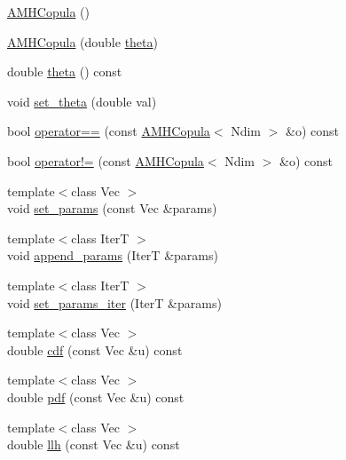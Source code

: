 \begin{DoxyCompactItemize}
\item 
\hyperlink{classprior__hessian_1_1AMHCopula_aea48377467c59f5f882e88f6611a8b56}{A\+M\+H\+Copula} ()
\item 
\hyperlink{classprior__hessian_1_1AMHCopula_a47d4b9c294f1a41069d8991513e81351}{A\+M\+H\+Copula} (double \hyperlink{classprior__hessian_1_1AMHCopula_a11696b4a8cef12a30706cd745820b201}{theta})
\item 
double \hyperlink{classprior__hessian_1_1AMHCopula_a11696b4a8cef12a30706cd745820b201}{theta} () const 
\item 
void \hyperlink{classprior__hessian_1_1AMHCopula_a80bcb09b15bdb3c404f028772932c081}{set\+\_\+theta} (double val)
\item 
bool \hyperlink{classprior__hessian_1_1AMHCopula_a29ff4d88263399c4ee76233644c0de9f}{operator==} (const \hyperlink{classprior__hessian_1_1AMHCopula}{A\+M\+H\+Copula}$<$ Ndim $>$ \&o) const 
\item 
bool \hyperlink{classprior__hessian_1_1AMHCopula_a52be601283a5a2dc619492d74fad860f}{operator!=} (const \hyperlink{classprior__hessian_1_1AMHCopula}{A\+M\+H\+Copula}$<$ Ndim $>$ \&o) const 
\item 
{\footnotesize template$<$class Vec $>$ }\\void \hyperlink{classprior__hessian_1_1AMHCopula_a20cebde68e635d3ad7d0ad67fbcd711e}{set\+\_\+params} (const Vec \&params)
\item 
{\footnotesize template$<$class IterT $>$ }\\void \hyperlink{classprior__hessian_1_1AMHCopula_a244661696f89f48e7466f095c1d3c536}{append\+\_\+params} (IterT \&params)
\item 
{\footnotesize template$<$class IterT $>$ }\\void \hyperlink{classprior__hessian_1_1AMHCopula_a5f5ab047fa0c58b93e7b8e072bc9c682}{set\+\_\+params\+\_\+iter} (IterT \&params)
\item 
{\footnotesize template$<$class Vec $>$ }\\double \hyperlink{classprior__hessian_1_1AMHCopula_aa18585757cb2d4b0723ed80258281278}{cdf} (const Vec \&u) const 
\item 
{\footnotesize template$<$class Vec $>$ }\\double \hyperlink{classprior__hessian_1_1AMHCopula_a8129324c2c30bd4900396198b0c9b957}{pdf} (const Vec \&u) const 
\item 
{\footnotesize template$<$class Vec $>$ }\\double \hyperlink{classprior__hessian_1_1AMHCopula_ad1ce11681554712db7a56bb4cb54c3e9}{llh} (const Vec \&u) const 

\end{DoxyCompactItemize}
